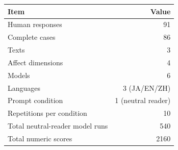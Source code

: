 \begin{tabular}{lr}
\toprule
Item & Value \\
\midrule
Human responses & 91 \\
Complete cases & 86 \\
Texts & 3 \\
Affect dimensions & 4 \\
Models & 6 \\
Languages & 3 (JA/EN/ZH) \\
Prompt condition & 1 (neutral reader) \\
Repetitions per condition & 10 \\
Total neutral-reader model runs & 540 \\
Total numeric scores & 2160 \\
\bottomrule
\end{tabular}
